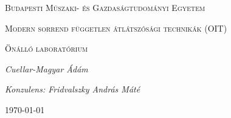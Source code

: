 \begin{titlepage}
	\centering
	{\large \textsc{Budapesti Műszaki- és Gazdaságtudományi Egyetem}\par}
	\vspace{1cm}
	{\huge \textsc{Modern sorrend független átlátszósági technikák (OIT)}\par}
	\vspace{0.5cm}
	{\large \textsc{Önálló laboratórium}\par}
	\vspace{2cm}
	{\large \itshape Cuellar-Magyar Ádám\par}
	{\large \itshape Konzulens: Fridvalszky András Máté\par}
	\vfill
	{\today\par}
\end{titlepage}